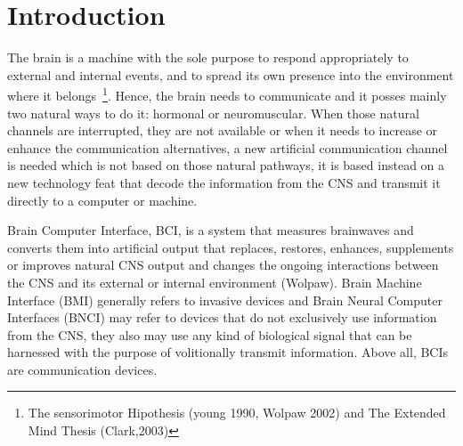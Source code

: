 \chapter*{Introduction}



The brain is a machine with the sole purpose to respond appropriately to external and internal events, and to spread its own presence into the environment where it belongs~\footnote{The sensorimotor Hipothesis (young 1990, Wolpaw 2002) and The Extended Mind Thesis (Clark,2003)}.  Hence, the brain needs to communicate and it posses mainly two natural ways to do it: hormonal or neuromuscular.  When those natural channels are interrupted, they are not available or when it needs to increase or enhance the communication alternatives, a new artificial communication channel is needed which is not based on those natural pathways, it is based instead on a new technology feat that decode the information from the CNS and transmit it directly to a computer or machine.

Brain Computer Interface, BCI, is a system that measures brainwaves and converts them into artificial output that replaces, restores, enhances, supplements or improves natural CNS output and changes the ongoing interactions between the CNS and its external or internal environment (Wolpaw). Brain Machine Interface (BMI) generally refers to invasive devices and Brain Neural Computer Interfaces (BNCI) may refer to devices that do not exclusively use information from the CNS, they also may use any kind of biological signal that can be harnessed with the purpose of volitionally transmit information. Above all, BCIs are communication devices.

